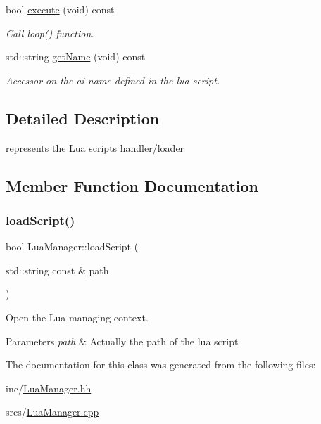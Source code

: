 \begin{DoxyCompactItemize}
\mbox{\label{class_lua_manager_af9bdb289e5e90cf610164d7254795b4a}} 
bool \hyperlink{class_lua_manager_af9bdb289e5e90cf610164d7254795b4a}{execute} (void) const
\begin{DoxyCompactList}\small\item\em Call loop() function. \end{DoxyCompactList}\item 
\mbox{\label{class_lua_manager_aab52ca0bbfc8941043740f501dbc85e6}} 
std\+::string \hyperlink{class_lua_manager_aab52ca0bbfc8941043740f501dbc85e6}{get\+Name} (void) const
\begin{DoxyCompactList}\small\item\em Accessor on the ai name defined in the lua script. \end{DoxyCompactList}\end{DoxyCompactItemize}


\subsection{Detailed Description}
represents the Lua scripts handler/loader 

\subsection{Member Function Documentation}
\mbox{\label{class_lua_manager_a113433dbaed2e770ed510610de8b6c4f}} 
\subsubsection{\texorpdfstring{load\+Script()}{loadScript()}}
{\footnotesize\ttfamily bool Lua\+Manager\+::load\+Script (\begin{DoxyParamCaption}\item[{std\+::string const \&}]{path }\end{DoxyParamCaption})}



Open the Lua managing context. 


\begin{DoxyParams}{Parameters}
{\em path} & Actually the path of the lua script \\
\hline
\end{DoxyParams}


The documentation for this class was generated from the following files\+:\begin{DoxyCompactItemize}
\item 
inc/\hyperlink{_lua_manager_8hh}{Lua\+Manager.\+hh}\item 
srcs/\hyperlink{_lua_manager_8cpp}{Lua\+Manager.\+cpp}\end{DoxyCompactItemize}

